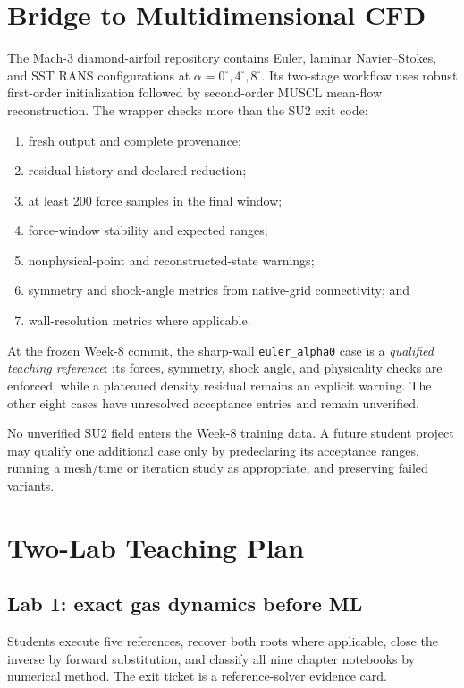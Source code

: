 \documentclass[11pt]{article}
\begin{document}
\section{Bridge to Multidimensional CFD}
The Mach-3 diamond-airfoil repository contains Euler, laminar Navier--Stokes,
and SST RANS configurations at $\alpha=0^\circ,4^\circ,8^\circ$. Its two-stage
workflow uses robust first-order initialization followed by second-order MUSCL
mean-flow reconstruction. The wrapper checks more than the SU2 exit code:
\begin{enumerate}
\item fresh output and complete provenance;
\item residual history and declared reduction;
\item at least 200 force samples in the final window;
\item force-window stability and expected ranges;
\item nonphysical-point and reconstructed-state warnings;
\item symmetry and shock-angle metrics from native-grid connectivity; and
\item wall-resolution metrics where applicable.
\end{enumerate}

At the frozen Week-8 commit, the sharp-wall \texttt{euler\_alpha0} case is a
\emph{qualified teaching reference}: its forces, symmetry, shock angle, and
physicality checks are enforced, while a plateaued density residual remains an
explicit warning. The other eight cases have unresolved acceptance entries and
remain unverified.

\begin{evidencebox}
No unverified SU2 field enters the Week-8 training data. A future student project
may qualify one additional case only by predeclaring its acceptance ranges,
running a mesh/time or iteration study as appropriate, and preserving failed variants.
\end{evidencebox}

\section{Two-Lab Teaching Plan}
\subsection{Lab 1: exact gas dynamics before ML}
Students execute five references, recover both roots where applicable, close the
inverse by forward substitution, and classify all nine chapter notebooks by
numerical method. The exit ticket is a reference-solver evidence card.
\end{document}
